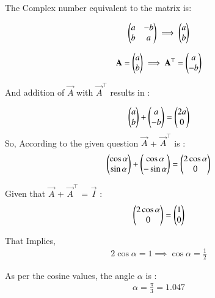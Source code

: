 
The Complex number equivalent to the matrix is: 

\begin{align}
\begin{pmatrix}a & -b\\ b & a \end{pmatrix} \implies \begin{pmatrix}a \\ b \end{pmatrix}
\end{align}
 
\begin{align}
 \mathbf{A}  = \begin{pmatrix} a \\ b \end{pmatrix}\implies \mathbf{A}^\top = \begin{pmatrix}a \\ -b\end{pmatrix}  
\end{align}



And addition of $\vec{A}$ with $\vec{A}^\top$ results in  :
  
\begin{align}
    \begin{pmatrix}  a \\ b \end{pmatrix} + \begin{pmatrix} a \\ -b \end{pmatrix} = \begin{pmatrix} 2a \\ 0\end{pmatrix}
\end{align}
So, According to the given question $\vec{A}$ + $\vec{A}^\top$ is : 
\begin{align}
   \begin{pmatrix}\cos{\alpha} \\ \sin{\alpha}\end{pmatrix} + \begin{pmatrix}\cos{\alpha} \\ -\sin{\alpha}\end{pmatrix} = \begin{pmatrix} 2\cos{\alpha} \\ 0\end{pmatrix} 
\end{align}

Given that  $\vec{A}$ + $\vec{A}^\top$ = $\vec{I}$ :
\begin{align}
  \begin{pmatrix}2\cos{\alpha} \\ 0\end{pmatrix} = \begin{pmatrix} 1 \\ 0\end{pmatrix} 
\end{align}

That Implies, 
\begin{align}
 2\cos{\alpha} = 1 \implies \cos{\alpha} = \frac{1}{2}   
\end{align}

As per the cosine values, the angle $\alpha$ is :
\begin{align}
 \alpha =  \frac{\pi}{3} = 1.047
\end{align}
  
